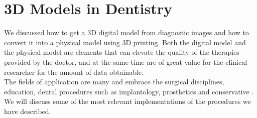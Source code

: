 
\chapter{3D Models in Dentistry} %

\label{Chapter6} %

 
 
We discussed how to get a 3D digital model from diagnostic images and how to convert it into a physical model using 3D printing. Both the digital model and the physical model are elements that can elevate the quality of the therapies provided by the doctor, and at the same time are of great value for the clinical researcher for the amount of data obtainable.\\
The fields of application are many and embrace the surgical disciplines, education, dental procedures such as implantology, prosthetics and conservative \parencite{Reference103}.
We will discuss some of the most relevant implementations of the procedures we have described.

